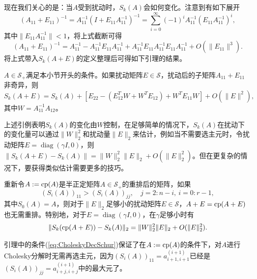 \documentclass[a4paper,10pt]{ctexart}
\begin{document}
现在我们关心的是：当$ A $受到扰动时，$ S_k(A) $会如何变化。注意到有如下展开
\[
    (A_{11}+E_{11})^{-1} = A_{11}^{-1}(I+E_{11}A_{11}^{-1})^{-1} = \sum_{i=0}^{\infty}(-1)^i A_{11}^{-1}(E_{11}A_{11}^{-1})^i,
\]
其中$ \| E_{11}A_{11}^{-1} \| < 1 $，将上式截断可得
\[
    (A_{11}+E_{11})^{-1} = A_{11}^{-1} - A_{11}^{-1}E_{11}A_{11}^{-1} + A_{11}^{-1}E_{11}A_{11}^{-1}E_{11}A_{11}^{-1} + O(\| E_{11} \|^3).
\]
将上式带入$ S_k(A+E) $的定义整理后可得如下引理的结果。
\begin{lemma}\label{lem:SchurCom}
    $ A\in \mathcal{S}_+ $满足本小节开头的条件。如果扰动矩阵$ E\in \mathcal{S} $，扰动后的子矩阵$ A_{11}+E_{11} $非奇异，则
    \begin{equation}
        S_k(A+E) = S_k(A) + [E_{22} - (E_{12}^T W + W^T E_{12}) + W^TE_{11}W] + O(\| E \|^2),
    \end{equation}
    其中$ W = A_{11}^{-1}A_{12} $。
\end{lemma}
上述引例表明$ S_k(A) $的变化由$ W $控制，在足够简单的情况下，$ S_k(A) $在扰动下的变化量可以通过$ \| W \|_2^2 $和扰动量$ \| E \|_2 $来估计，例如当不需要选主元时，令扰动矩阵$ E = \operatorname{diag}(\gamma I, 0) $，则$ \| S_k(A+E) - S_k(A) \| = \| W \|_2^2 \| E \|_2 + O(\| E \|_2^2) $。但在更复杂的情况下，要获得类似估计需要更多的技巧。

\begin{lemma}\label{lem:CholeskyDecSchur}
    重新令$ A:={\rm cp}(A) $是半正定矩阵$ A\in \mathcal{S}_+ $的重排后的矩阵，如果
    \begin{equation}\label{eq:CholeskyDecSchur}
        (S_i(A))_{11} > (S_i(A))_{jj},\quad j = 2:n-i,\ i = 0:r-1,
    \end{equation}
    其中$ S_0(A) =A $，则对于$ \| E \|_2 $足够小的扰动矩阵$ E\in \mathcal{S} $，$ A+E = {\rm cp}(A+E) $也无需重排。特别地，对于$ E = \operatorname{diag}(\gamma I, 0) $，在$ \gamma $足够小时有
    \begin{equation}
        \| S_k({\rm cp}(A+E)) - S_k(A) \|_2 = \| W \|_2^2 \| E \|_2 + O(\| E \|_2^2).
    \end{equation}
\end{lemma}
\noindent 引理中的条件(\ref{eq:CholeskyDecSchur})保证了在$ A:={\rm cp}(A) $的条件下，对$ A $进行Cholesky分解时无需再选主元，因为$ (S_i(A))_{11} = a_{i+1,i+1}^{(i+1)} $已经是$ (S_i(A))_{jj} = a_{i+j,i+j}^{(i+1)} $中的最大元了。
\end{document}
